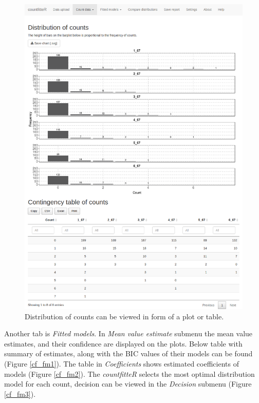 \begin{figure}[htbp]
  \centering
  \includegraphics[width=0.99\columnwidth]{fig/cf_cd3.png}
  \caption{Distribution of counts can be viewed in form of a plot or table.}
    \label{cf_cd3}
\end{figure}

Another tab is \textit{Fitted models}. In \textit{Mean value estimate} submenu the mean value estimates, and their confidence are displayed on the plots. Below table with summary of estimates, along with the BIC values of their models can be found (Figure \ref{cf_fm1}). The table in \textit{Coefficients} shows estimated coefficients of models (Figure \ref{cf_fm2}). The \emph{countfitteR} selects the most optimal distribution model for each count, decision can be viewed in the \textit{Decision} submenu (Figure \ref{cf_fm3}).

